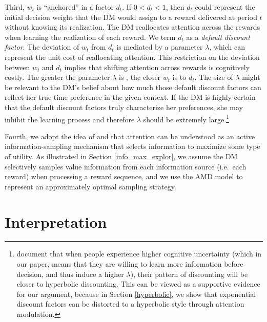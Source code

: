 \documentclass[
  12pt,
]{article}
\begin{document}
Third, \(w_t\) is ``anchored'' in a factor \(d_t\). If \(0<d_t<1\), then
\(d_t\) could represent the initial decision weight that the DM would
assign to a reward delivered at period \(t\) without knowing its
realization. The DM reallocates attention across the rewards when
learning the realization of each reward. We term \(d_t\) as a
\emph{default} \emph{discount factor}. The deviation of \(w_t\) from
\(d_t\) is mediated by a parameter \(\lambda\), which can represent the
unit cost of reallocating attention. This restriction on the deviation
between \(w_t\) and \(d_t\) implies that shifting attention across
rewards is cognitively costly. The greater the parameter \(\lambda\) is
, the closer \(w_t\) is to \(d_t\). The size of \(\lambda\) might be
relevant to the DM's belief about how much those default discount
factors can reflect her true time preference in the given context. If
the DM is highly certain that the default discount factors truly
characterize her preferences, she may inhibit the learning process and
therefore \(\lambda\) should be extremely large.\footnote{\citet{enke2023complexity}
  document that when people experience higher cognitive uncertainty
  (which in our paper, means that they are willing to learn more
  information before decision, and thus induce a higher \(\lambda\)),
  their pattern of discounting will be closer to hyperbolic discounting.
  This can be viewed as a supportive evidence for our argument, because
  in Section \ref{hyperbolic}, we show that exponential discount factors
  can be distorted to a hyperbolic style through attention modulation.}

Fourth, we adopt the idea of \citet{gottlieb2012attention} and
\citet{gottlieb2013information} that attention can be understood as an
active information-sampling mechanism that selects information to
maximize some type of utility. As illustrated in Section
\ref{info_max_explor}, we assume the DM selectively samples value
information from each information source (i.e.~each reward) when
processing a reward sequence, and we use the AMD model to represent an
approximately optimal sampling strategy.

\hypertarget{interpretation}{%
\section{\texorpdfstring{Interpretation
\label{interpretation}}{Interpretation }}\label{interpretation}}
\end{document}
